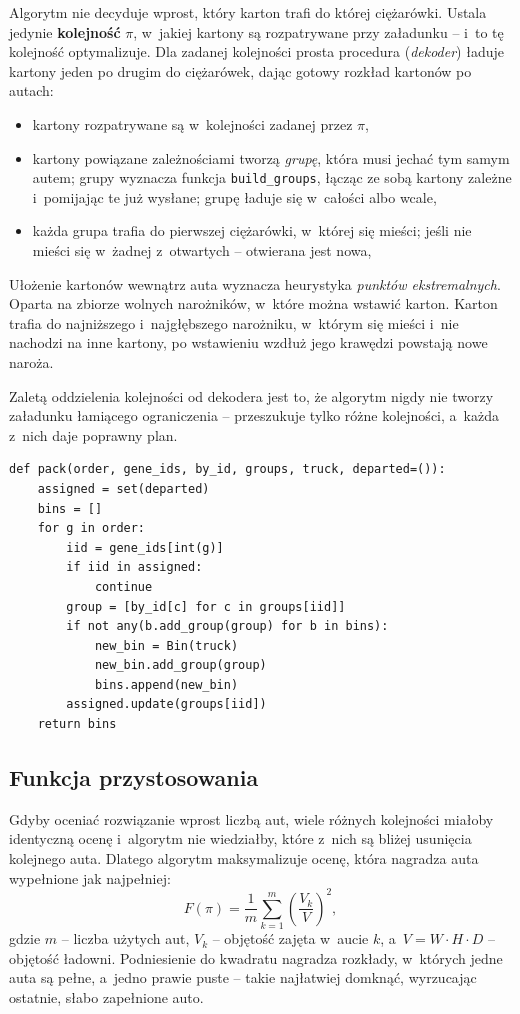 \documentclass[12pt]{article}
\begin{document}
Algorytm nie decyduje wprost, który karton trafi do której ciężarówki. Ustala jedynie \textbf{kolejność} $\pi$, w~jakiej kartony są rozpatrywane przy załadunku -- i~to tę kolejność optymalizuje. Dla zadanej kolejności prosta procedura (\textit{dekoder}) ładuje kartony jeden po drugim do ciężarówek, dając gotowy rozkład kartonów po autach:
\begin{itemize}
    \item kartony rozpatrywane są w~kolejności zadanej przez $\pi$,
    \item kartony powiązane zależnościami tworzą \textit{grupę}, która musi jechać tym samym autem; grupy wyznacza funkcja \texttt{build\_groups}, łącząc ze sobą kartony zależne i~pomijając te już wysłane; grupę ładuje się w~całości albo wcale,
    \item każda grupa trafia do pierwszej ciężarówki, w~której się mieści; jeśli nie mieści się w~żadnej z~otwartych -- otwierana jest nowa,
\end{itemize}

Ułożenie kartonów wewnątrz auta wyznacza heurystyka \textit{punktów ekstremalnych}. Oparta na zbiorze wolnych narożników, w~które można wstawić karton. Karton trafia do najniższego i~najgłębszego narożniku, w~którym się mieści i~nie nachodzi na inne kartony, po wstawieniu wzdłuż jego krawędzi powstają nowe naroża.

Zaletą oddzielenia kolejności od dekodera jest to, że algorytm nigdy nie tworzy załadunku łamiącego ograniczenia -- przeszukuje tylko różne kolejności, a~każda z~nich daje poprawny plan.

\begin{lstlisting}
def pack(order, gene_ids, by_id, groups, truck, departed=()):
    assigned = set(departed)
    bins = []
    for g in order:
        iid = gene_ids[int(g)]
        if iid in assigned:
            continue
        group = [by_id[c] for c in groups[iid]]
        if not any(b.add_group(group) for b in bins):
            new_bin = Bin(truck)
            new_bin.add_group(group)
            bins.append(new_bin)
        assigned.update(groups[iid])
    return bins
\end{lstlisting}

\subsection{Funkcja przystosowania}

Gdyby oceniać rozwiązanie wprost liczbą aut, wiele różnych kolejności miałoby identyczną ocenę i~algorytm nie wiedziałby, które z~nich są bliżej usunięcia kolejnego auta. Dlatego algorytm maksymalizuje ocenę, która nagradza auta wypełnione jak najpełniej:
\[
F(\pi)=\frac{1}{m}\sum_{k=1}^{m}\left(\frac{V_k}{V}\right)^{2},
\]
gdzie $m$ -- liczba użytych aut, $V_k$ -- objętość zajęta w~aucie $k$, a~$V=W\cdot H\cdot D$ -- objętość ładowni. Podniesienie do kwadratu nagradza rozkłady, w~których jedne auta są pełne, a~jedno prawie puste -- takie najłatwiej domknąć, wyrzucając ostatnie, słabo zapełnione auto.
\end{document}

